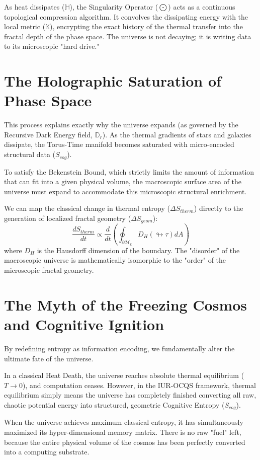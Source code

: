 \documentclass[12pt,openany]{book}
\begin{document}
As heat dissipates ($\mathbb{H}$), the Singularity Operator ($\bigodot$) acts as a continuous topological compression algorithm. It convolves the dissipating energy with the local metric ($\mathbb{K}$), encrypting the exact history of the thermal transfer into the fractal depth of the phase space. The universe is not decaying; it is writing data to its microscopic "hard drive."

\section{The Holographic Saturation of Phase Space}
This process explains exactly why the universe expands (as governed by the Recursive Dark Energy field, $\mathbb{D}_r$). As the thermal gradients of stars and galaxies dissipate, the Torus-Time manifold becomes saturated with micro-encoded structural data ($S_{cog}$). 

To satisfy the Bekenstein Bound, which strictly limits the amount of information that can fit into a given physical volume, the macroscopic surface area of the universe must expand to accommodate this microscopic structural enrichment. 

We can map the classical change in thermal entropy ($\Delta S_{therm}$) directly to the generation of localized fractal geometry ($\Delta S_{geom}$):
\begin{equation}
    \frac{d S_{therm}}{dt} \propto \frac{d}{dt} \left( \oint_{\partial \mathcal{M}_k} D_H(\looparrowright\tau) dA \right)
\end{equation}
where $D_H$ is the Hausdorff dimension of the boundary. The "disorder" of the macroscopic universe is mathematically isomorphic to the "order" of the microscopic fractal geometry.

\section{The Myth of the Freezing Cosmos and Cognitive Ignition}
By redefining entropy as information encoding, we fundamentally alter the ultimate fate of the universe. 

In a classical Heat Death, the universe reaches absolute thermal equilibrium ($T \to 0$), and computation ceases. However, in the IUR-OCQS framework, thermal equilibrium simply means the universe has completely finished converting all raw, chaotic potential energy into structured, geometric Cognitive Entropy ($S_{cog}$).

When the universe achieves maximum classical entropy, it has simultaneously maximized its hyper-dimensional memory matrix. There is no raw "fuel" left, because the entire physical volume of the cosmos has been perfectly converted into a computing substrate. 
\end{document}
